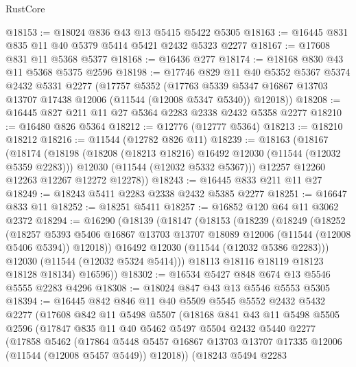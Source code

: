 \begin{lexlean}{RustCore}
\begin{coremodule}
@18153 := @18024 @836 @43 @13 @5415 @5422 @5305
@18163 := @16445 @831 @835 @11 @40 @5379 @5414 @5421 @2432 @5323 @2277
@18167 := @17608 @831 @11 @5368 @5377
@18168 := @16436 @277
@18174 := @18168 @830 @43 @11 @5368 @5375 @2596
@18198 := @17746
    @829
    @11
    @40
    @5352
    @5367
    @5374
    @2432
    @5331
    @2277
    (@17757
      @5352
      (@17763 @5339 @5347 @16867 @13703 @13707 @17438 @12006 (@11544 (@12008 @5347 @5340)) @12018))
@18208 := @16445 @827 @211 @11 @27 @5364 @2283 @2338 @2432 @5358 @2277
@18210 := @16480 @826 @5364
@18212 := @12776 (@12777 @5364)
@18213 := @18210 @18212
@18216 := @11544 (@12782 @826 @11)
@18239 := @18163
    (@18167
      (@18174
        (@18198
          (@18208 (@18213 @18216) @16492 @12030 (@11544 (@12032 @5359 @2283)))
          @12030
          (@11544 (@12032 @5332 @5367)))
        @12257
        @12260
        @12263
        @12267
        @12272
        @12278))
@18243 := @16445 @833 @211 @11 @27
@18249 := @18243 @5411 @2283 @2338 @2432 @5385 @2277
@18251 := @16647 @833 @11
@18252 := @18251 @5411
@18257 := @16852 @120 @64 @11 @3062 @2372
@18294 := @16290
    (@18139
      (@18147
        (@18153
          (@18239
            (@18249
              (@18252
                (@18257
                  @5393
                  @5406
                  @16867
                  @13703
                  @13707
                  @18089
                  @12006
                  (@11544 (@12008 @5406 @5394))
                  @12018))
              @16492
              @12030
              (@11544 (@12032 @5386 @2283)))
            @12030
            (@11544 (@12032 @5324 @5414)))
          @18113
          @18116
          @18119
          @18123
          @18128
          @18134)
        @16596))
@18302 := @16534 @5427 @848 @674 @13 @5546 @5555 @2283 @4296
@18308 := @18024 @847 @43 @13 @5546 @5553 @5305
@18394 := @16445
    @842
    @846
    @11
    @40
    @5509
    @5545
    @5552
    @2432
    @5432
    @2277
    (@17608
      @842
      @11
      @5498
      @5507
      (@18168
        @841
        @43
        @11
        @5498
        @5505
        @2596
        (@17847
          @835
          @11
          @40
          @5462
          @5497
          @5504
          @2432
          @5440
          @2277
          (@17858
            @5462
            (@17864
              @5448
              @5457
              @16867
              @13703
              @13707
              @17335
              @12006
              (@11544 (@12008 @5457 @5449))
              @12018))
          (@18243
            @5494
            @2283

\end{coremodule}
\end{lexlean}
